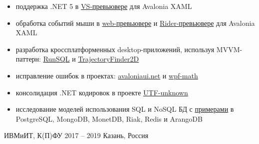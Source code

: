\documentclass[10pt,a4paper,ragged2e,withhyper]{altacv}
\begin{document}
\begin{paracol}{2}
\begin{itemize}
  \item поддержка .NET 5 в
  \href{https://github.com/AvaloniaUI/AvaloniaVS/pull/181}{VS-превьювере}
  для Avalonia XAML 
  \smallskip

  \item обработка событий мыши в
  \href{https://github.com/AvaloniaUI/Avalonia/pull/4418}{web-превьювере}
  и \href{https://github.com/ForNeVeR/AvaloniaRider/pull/82}{Rider-превьювере}
  для Avalonia XAML 
  \smallskip

  \item разработка кроссплатформенных desktop-приложений, используя MVVM-паттерн:
  \href{https://github.com/rstm-sf/RunSQL}{RunSQL} и
  \href{https://github.com/rstm-sf/TrajectoryFinder2D}{TrajectoryFinder2D}
  \smallskip

  \item исправление ошибок в проектах:
  \href{https://github.com/AvaloniaUI/avaloniaui.net/commits?author=rstm-sf}{avaloniaui.net} и
  \href{https://github.com/ForNeVeR/wpf-math/commits?author=rstm-sf}{wpf-math}
  \smallskip

  \item консолидация .NET кодировок в проекте 
  \href{https://github.com/CharsetDetector/UTF-unknown/commits?author=rstm-sf}{UTF-unknown}
  \smallskip

  \item исследование моделей использования SQL и NoSQL БД с
  \href{https://bitbucket.org/rstm-sf/game_with_db}{примерами} в
  PostgreSQL, MongoDB, MonetDB, Riak, Redis и ArangoDB

\end{itemize}

\switchcolumn




\smallskip
{}


{ИВМиИТ, К(П)ФУ}
{2017 -- 2019}
{Казань, Россия}


\end{paracol}
\end{document}
